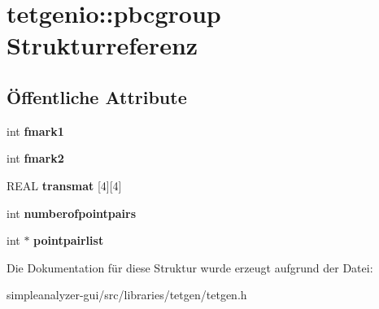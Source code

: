 \hypertarget{structtetgenio_1_1pbcgroup}{\section{tetgenio\-:\-:pbcgroup Strukturreferenz}
\label{structtetgenio_1_1pbcgroup}
}
\subsection*{Öffentliche Attribute}
\begin{DoxyCompactItemize}
\item 
\hypertarget{structtetgenio_1_1pbcgroup_af2e1ceaf4bb1ec4420e9ce7dcf5b009f}{int {\bfseries fmark1}}\label{structtetgenio_1_1pbcgroup_af2e1ceaf4bb1ec4420e9ce7dcf5b009f}

\item 
\hypertarget{structtetgenio_1_1pbcgroup_a6a5eeda2d871fa9d220a408eaf37281d}{int {\bfseries fmark2}}\label{structtetgenio_1_1pbcgroup_a6a5eeda2d871fa9d220a408eaf37281d}

\item 
\hypertarget{structtetgenio_1_1pbcgroup_aac987a422e4985c32c8b04654f4e8e16}{R\-E\-A\-L {\bfseries transmat} \mbox{[}4\mbox{]}\mbox{[}4\mbox{]}}\label{structtetgenio_1_1pbcgroup_aac987a422e4985c32c8b04654f4e8e16}

\item 
\hypertarget{structtetgenio_1_1pbcgroup_adbce985d519f6d078f2222ec1b8279ea}{int {\bfseries numberofpointpairs}}\label{structtetgenio_1_1pbcgroup_adbce985d519f6d078f2222ec1b8279ea}

\item 
\hypertarget{structtetgenio_1_1pbcgroup_ac0b5b35f1ec88b265642b2d21144bc72}{int $\ast$ {\bfseries pointpairlist}}\label{structtetgenio_1_1pbcgroup_ac0b5b35f1ec88b265642b2d21144bc72}

\end{DoxyCompactItemize}


Die Dokumentation für diese Struktur wurde erzeugt aufgrund der Datei\-:\begin{DoxyCompactItemize}
\item 
simpleanalyzer-\/gui/src/libraries/tetgen/tetgen.\-h\end{DoxyCompactItemize}
